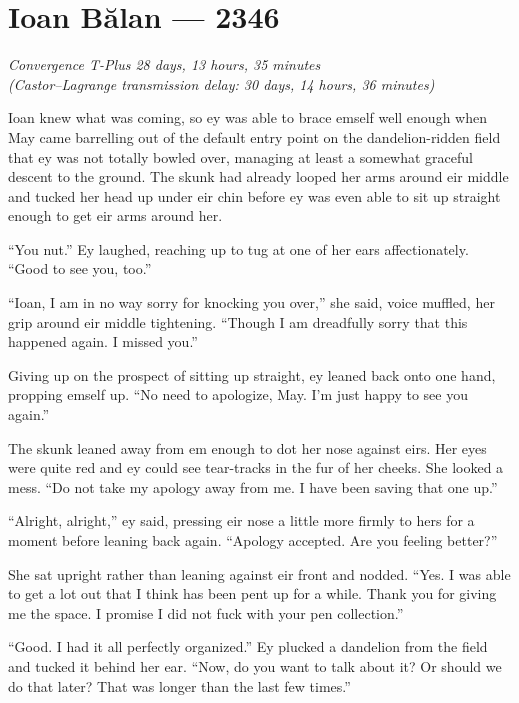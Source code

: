 \hypertarget{ioan-bux103lan-2346}{%
\chapter{Ioan Bălan — 2346}}

\begin{center}
\emph{Convergence T-Plus 28 days, 13 hours, 35 minutes}\\
\emph{(Castor--Lagrange transmission delay: 30 days, 14 hours, 36 minutes)}
\end{center}

\noindent Ioan knew what was coming, so ey was able to brace emself well enough when May came barrelling out of the default entry point on the dandelion-ridden field that ey was not totally bowled over, managing at least a somewhat graceful descent to the ground. The skunk had already looped her arms around eir middle and tucked her head up under eir chin before ey was even able to sit up straight enough to get eir arms around her.

``You nut.'' Ey laughed, reaching up to tug at one of her ears affectionately. ``Good to see you, too.''

``Ioan, I am in no way sorry for knocking you over,'' she said, voice muffled, her grip around eir middle tightening. ``Though I am dreadfully sorry that this happened again. I missed you.''

Giving up on the prospect of sitting up straight, ey leaned back onto one hand, propping emself up. ``No need to apologize, May. I'm just happy to see you again.''

The skunk leaned away from em enough to dot her nose against eirs. Her eyes were quite red and ey could see tear-tracks in the fur of her cheeks. She looked a mess. ``Do not take my apology away from me. I have been saving that one up.''

``Alright, alright,'' ey said, pressing eir nose a little more firmly to hers for a moment before leaning back again. ``Apology accepted. Are you feeling better?''

She sat upright rather than leaning against eir front and nodded. ``Yes. I was able to get a lot out that I think has been pent up for a while. Thank you for giving me the space. I promise I did not fuck with your pen collection.''

``Good. I had it all perfectly organized.'' Ey plucked a dandelion from the field and tucked it behind her ear. ``Now, do you want to talk about it? Or should we do that later? That was longer than the last few times.''

